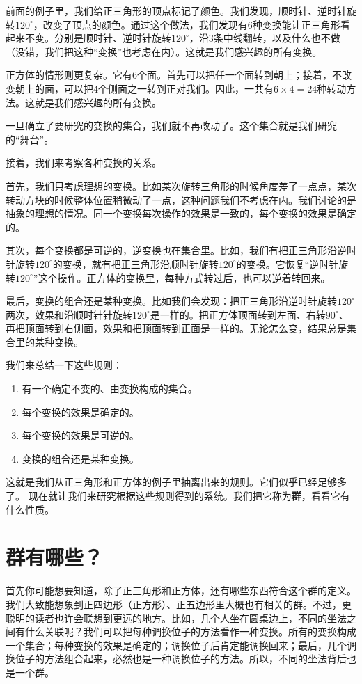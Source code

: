 \documentclass[12pt,UTF8,fontset=none]{ctexbook}
\begin{document}
前面的例子里，我们给正三角形的顶点标记了颜色。我们发现，顺时针、逆时针旋转$120^\circ$，改变了顶点的颜色。通过这个做法，我们发现有$6$种变换能让正三角形看起来不变。分别是顺时针、逆时针旋转$120^\circ$，沿$3$条中线翻转，以及什么也不做（没错，我们把这种“变换”也考虑在内）。这就是我们感兴趣的所有变换。

正方体的情形则更复杂。它有$6$个面。首先可以把任一个面转到朝上；接着，不改变朝上的面，可以把$4$个侧面之一转到正对我们。因此，一共有$6\times 4 = 24$种转动方法。这就是我们感兴趣的所有变换。

一旦确立了要研究的变换的集合，我们就不再改动了。这个集合就是我们研究的“舞台”。

接着，我们来考察各种变换的关系。

首先，我们只考虑理想的变换。比如某次旋转三角形的时候角度差了一点点，某次转动方块的时候整体位置稍微动了一点，这种问题我们不考虑在内。我们讨论的是抽象的理想的情况。同一个变换每次操作的效果是一致的，每个变换的效果是确定的。

其次，每个变换都是可逆的，逆变换也在集合里。比如，我们有把正三角形沿逆时针旋转$120^\circ$的变换，就有把正三角形沿顺时针旋转$120^\circ$的变换。它恢复“逆时针旋转$120^\circ$”这个操作。正方体的变换里，每种方式转过后，也可以逆着转回来。

最后，变换的组合还是某种变换。比如我们会发现：把正三角形沿逆时针旋转$120^\circ$两次，效果和沿顺时针针旋转$120^\circ$是一样的。把正方体顶面转到左面、右转$90^\circ$、再把顶面转到右侧面，效果和把顶面转到正面是一样的。无论怎么变，结果总是集合里的某种变换。

我们来总结一下这些规则：
\begin{enumerate}[label=\arabic*.]
    \item 有一个确定不变的、由变换构成的集合。
    \item 每个变换的效果是确定的。
    \item 每个变换的效果是可逆的。
    \item 变换的组合还是某种变换。
\end{enumerate}
这就是我们从正三角形和正方体的例子里抽离出来的规则。它们似乎已经足够多了。
现在就让我们来研究根据这些规则得到的系统。我们把它称为\textbf{群}，看看它有什么性质。

\section{群有哪些？}

首先你可能想要知道，除了正三角形和正方体，还有哪些东西符合这个群的定义。我们大致能想象到正四边形（正方形）、正五边形里大概也有相关的群。不过，更聪明的读者也许会联想到更远的地方。比如，几个人坐在圆桌边上，不同的坐法之间有什么关联呢？我们可以把每种调换位子的方法看作一种变换。所有的变换构成一个集合；每种变换的效果是确定的；调换位子后肯定能调换回来；最后，几个调换位子的方法组合起来，必然也是一种调换位子的方法。所以，不同的坐法背后也是一个群。
\end{document}
